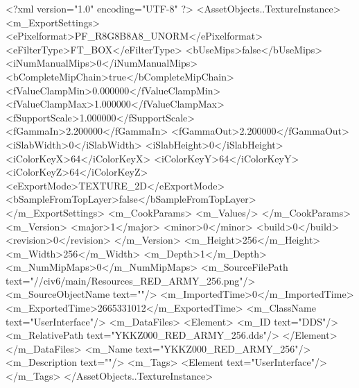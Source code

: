 <?xml version="1.0" encoding="UTF-8" ?>
<AssetObjects..TextureInstance>
	<m_ExportSettings>
		<ePixelformat>PF_R8G8B8A8_UNORM</ePixelformat>
		<eFilterType>FT_BOX</eFilterType>
		<bUseMips>false</bUseMips>
		<iNumManualMips>0</iNumManualMips>
		<bCompleteMipChain>true</bCompleteMipChain>
		<fValueClampMin>0.000000</fValueClampMin>
		<fValueClampMax>1.000000</fValueClampMax>
		<fSupportScale>1.000000</fSupportScale>
		<fGammaIn>2.200000</fGammaIn>
		<fGammaOut>2.200000</fGammaOut>
		<iSlabWidth>0</iSlabWidth>
		<iSlabHeight>0</iSlabHeight>
		<iColorKeyX>64</iColorKeyX>
		<iColorKeyY>64</iColorKeyY>
		<iColorKeyZ>64</iColorKeyZ>
		<eExportMode>TEXTURE_2D</eExportMode>
		<bSampleFromTopLayer>false</bSampleFromTopLayer>
	</m_ExportSettings>
	<m_CookParams>
		<m_Values/>
	</m_CookParams>
	<m_Version>
		<major>1</major>
		<minor>0</minor>
		<build>0</build>
		<revision>0</revision>
	</m_Version>
	<m_Height>256</m_Height>
	<m_Width>256</m_Width>
	<m_Depth>1</m_Depth>
	<m_NumMipMaps>0</m_NumMipMaps>
	<m_SourceFilePath text="//civ6/main/Resources_RED_ARMY_256.png"/>
	<m_SourceObjectName text=""/>
	<m_ImportedTime>0</m_ImportedTime>
	<m_ExportedTime>2665331012</m_ExportedTime>
	<m_ClassName text="UserInterface"/>
	<m_DataFiles>
		<Element>
			<m_ID text="DDS"/>
			<m_RelativePath text="YKKZ000_RED_ARMY_256.dds"/>
		</Element>
	</m_DataFiles>
	<m_Name text="YKKZ000_RED_ARMY_256"/>
	<m_Description text=""/>
	<m_Tags>
		<Element text="UserInterface"/>
	</m_Tags>
</AssetObjects..TextureInstance>

